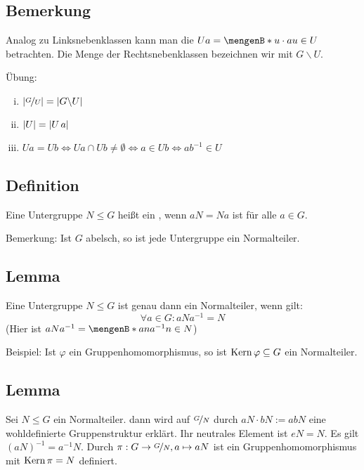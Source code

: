 \subsection[Bemerkung zu Rechtsnebenklassen]{Bemerkung} %
\label{sub:119}
Analog zu Linksnebenklassen kann man die  $U a = \set[u \cdot  a]{u \in U} $ betrachten. Die Menge der Rechtsnebenklassen bezeichnen wir mit $G \backslash U$.

Übung: 
\begin{enumerate}[(i)]
	\item $\abs*{\nicefrac{G}{U}} = \abs*{G \backslash U}  $
	\item $\abs*{U} = \abs*{U \,a}  $
	\item $U a = U b \Leftrightarrow U a \cap U b \not= \emptyset \Leftrightarrow a \in U b \Leftrightarrow a b ^{-1} \in U$
\end{enumerate} 

\subsection[Definition: Normalteiler]{Definition} %
\label{sub:120}
Eine Untergruppe $N \le G$ heißt ein , wenn $a N = N a$ ist für alle $a \in G$. 

Bemerkung: Ist $G$ abelsch, so ist jede Untergruppe ein Normalteiler.

\subsection[Lemma: Kriterium für Normalteiler]{Lemma} %
\label{sub:121}
Eine Untergruppe $N \le G$ ist genau dann ein Normalteiler, wenn gilt:
\[
	\forall a \in G : a N a ^{-1} = N
\]
(Hier ist $a N a ^{-1} = \set[a n a ^{-1}]{n \in N} $)

Beispiel: Ist $\varphi$ ein Gruppenhomomorphismus, so ist $\Kern \varphi \subseteq G$ ein Normalteiler.

\subsection[Lemma: Für einen Normalteiler $N$ hat $\nicefrac{G}{N}$ Gruppenstruktur]{Lemma} %
\label{sub:122}
Sei $N \le G$ ein Normalteiler. dann wird auf $\nicefrac{G}{N}$ durch $aN \cdot bN := abN$ eine wohldefinierte Gruppenstruktur erklärt. Ihr neutrales Element ist $eN=N$.
Es gilt $(aN)^{-1} = a ^{-1}N$. Durch $\pi : G \to \nicefrac{G}{N}, a \mapsto aN$ ist ein Gruppenhomomorphismus mit $\Kern \pi = N$ definiert.

